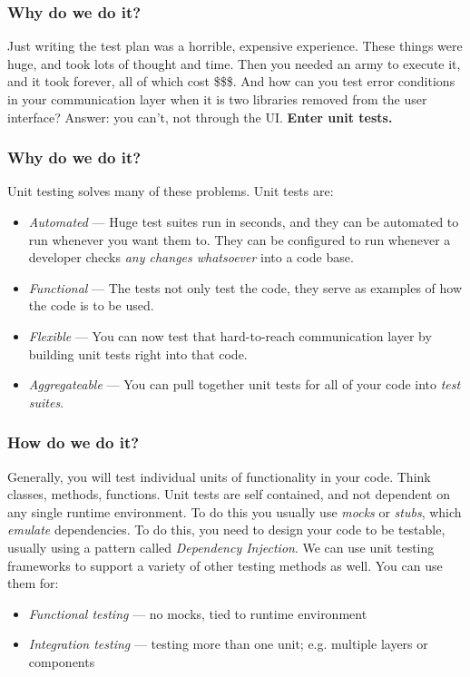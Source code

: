 \documentclass[t, 10pt]{beamer}
\begin{document}
\begin{frame}
\frametitle{Why do we do it?}
Just writing the test plan was a horrible, expensive experience.  These things were huge, and took lots of thought and time.  Then you needed an army to execute it, and it took forever, all of which cost \$\$\$.  And how can you test error conditions in your communication layer when it is two libraries removed from the user interface?
\newline
\newline
\newline
Answer: you can't, not through the UI.
\newline
\newline
\newline
\textbf{Enter unit tests.}
\end{frame}

\begin{frame}
\frametitle{Why do we do it?}
Unit testing solves many of these problems.  Unit tests are:
\begin{itemize}
\item \textit{Automated} --- Huge test suites run in seconds, and they can be automated to run whenever you want them to.  They can be configured to run whenever a developer checks \textit{any changes whatsoever} into a code base.
\item \textit{Functional} --- The tests not only test the code, they serve as examples of how the code is to be used.
\item \textit{Flexible} --- You can now test that hard-to-reach communication layer by building unit tests right into that code.
\item \textit{Aggregateable} --- You can pull together unit tests for all of your code into \textit{test suites}.
\end{itemize}
\end{frame}

\begin{frame}
\frametitle{How do we do it?}
Generally, you will test individual units of functionality in your code.  Think classes, methods, functions.  Unit tests are self contained, and not dependent on any single runtime environment.  To do this you usually use \textit{mocks} or \textit{stubs}, which \textit{emulate} dependencies.  To do this, you need to design your code to be testable, usually using a pattern called \textit{Dependency Injection}.
\newline
\newline
We can use unit testing frameworks to support a variety of other testing methods as well.  You can use them for:
\begin{itemize}
\item \textit{Functional testing} --- no mocks, tied to runtime environment
\item \textit{Integration testing} --- testing more than one unit; e.g. multiple layers or components
\end{itemize}
\end{frame}
\end{document}
